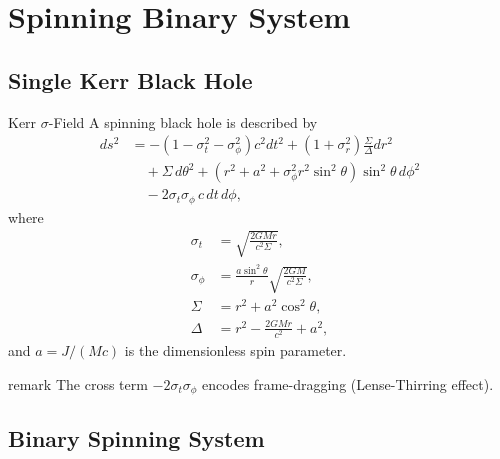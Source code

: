 \documentclass[11pt,a4paper]{article}
\theoremstyle{definition}
\theoremstyle{remark}
\begin{document}
	\section{Spinning Binary System}
	
	\subsection{Single Kerr Black Hole}
	
	Kerr $\sigma$-Field
		A spinning black hole is described by
		\begin{equation}
			\boxed{
				\begin{aligned}
					ds^2 &= -(1 - \sigma_t^2 - \sigma_\phi^2) c^2 dt^2 + (1 + \sigma_r^2) \frac{\Sigma}{\Delta} dr^2\\
					&\quad + \Sigma \, d\theta^2 + \left(r^2 + a^2 + \sigma_\phi^2 r^2 \sin^2\theta\right) \sin^2\theta \, d\phi^2\\
					&\quad - 2\sigma_t \sigma_\phi \, c \, dt \, d\phi,
				\end{aligned}
			}
		\end{equation}
		where
		\begin{align}
			\sigma_t &= \sqrt{\frac{2GMr}{c^2\Sigma}},\\
			\sigma_\phi &= \frac{a\sin^2\theta}{r} \sqrt{\frac{2GM}{c^2\Sigma}},\\
			\Sigma &= r^2 + a^2\cos^2\theta,\\
			\Delta &= r^2 - \frac{2GMr}{c^2} + a^2,
		\end{align}
		and $a = J/(Mc)$ is the dimensionless spin parameter.
	
	remark
		The cross term $-2\sigma_t\sigma_\phi$ encodes frame-dragging (Lense-Thirring effect).
	
	\subsection{Binary Spinning System}
	
\end{document}
